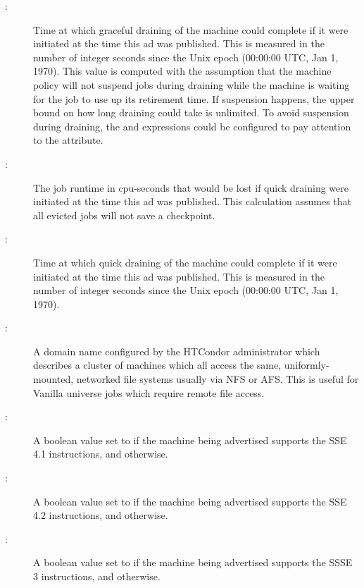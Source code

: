 \begin{description}
\item[:] Time at
which graceful draining of the machine could complete if it were
initiated at the time this ad was published.  This is measured in the
number of integer seconds since the Unix epoch (00:00:00 UTC, Jan 1,
1970).  This value is computed with the assumption that the machine
policy will not suspend jobs during draining while the machine is
waiting for the job to use up its retirement time.  If suspension
happens, the upper bound on how long draining could take is
unlimited.  To avoid suspension during draining, the 
and  expressions could be configured to pay
attention to the  attribute.
%
\item[:] The
job runtime in cpu-seconds that would be lost if quick draining
were initiated at the time this ad was published.  This calculation assumes
that all evicted jobs will not save a checkpoint.
%
\item[:] Time at
which quick draining of the machine could complete if it were
initiated at the time this ad was published.  This is measured in the
number of integer seconds since the Unix epoch (00:00:00 UTC, Jan 1,
1970).
%
\item[:] A domain name configured by the
HTCondor administrator which describes a cluster of machines which all
access the same, uniformly-mounted, networked file systems usually via
NFS or AFS.  This is useful for Vanilla universe jobs which require
remote file access.
%
\item[:] A boolean value set to 
 if the machine being advertised supports
the SSE 4.1 instructions, and  otherwise.
%
\item[:] A boolean value set to 
if the machine being advertised supports
the SSE 4.2 instructions, and  otherwise.
%
\item[:] A boolean value set to 
if the machine being advertised supports
the SSSE 3 instructions, and  otherwise.

\end{description}
